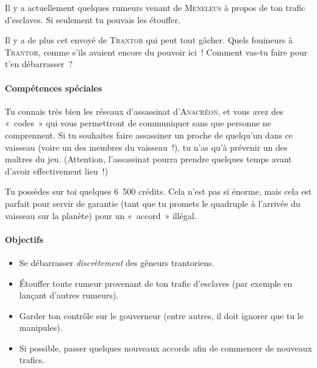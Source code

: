 {Il y a actuellement quelques rumeurs venant de \textsc{Meneleus} à propos de ton trafic d’esclaves.
Si seulement tu pouvais les étouffer.

Il y a de plus cet envoyé de \textsc{Trantor} qui peut tout gâcher.
Quels fouineurs à \textsc{Trantor}, comme s’ils avaient encore du pouvoir ici~!
Comment vas-tu faire pour t’en débarrasser~?

\paragraph{Compétences spéciales}
{
Tu connais très bien les réseaux d’assassinat d’\textsc{Anacréon}, et vous avez des «~codes~» qui vous permettront de communiquer sans que personne ne comprennent.
Si tu souhaites faire assassiner un proche de quelqu’un dans ce vaisseau (voire un des membres du vaisseau~!), tu n’as qu’à prévenir un des maîtres du jeu.
(Attention, l’assassinat pourra prendre quelques temps avant d’avoir effectivement lieu~!)
}

Tu possèdes sur toi quelques 6~500 crédits.
Cela n’est pas si énorme, mais cela est parfait pour servir de garantie (tant que tu promets le quadruple à l’arrivée du vaisseau sur la planète) pour un «~accord~» illégal.

\paragraph{Objectifs}{
\begin{itemize}
	\item Se débarrasser \textit{discrètement} des gêneurs trantoriens.
	\item Étouffer toute rumeur provenant de ton trafic d’esclaves (par exemple en lançant d’autres rumeurs).
	\item Garder ton contrôle sur le gouverneur (entre autres, il doit ignorer que tu le manipules).
	\item Si possible, passer quelques nouveaux accords afin de commencer de nouveaux trafics.
\end{itemize}
}
}

